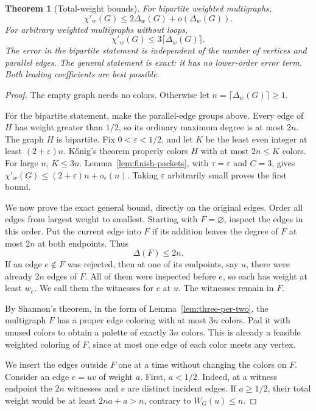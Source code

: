 \documentclass[11pt]{article}
\newtheorem{theorem}{Theorem}[section]
\theoremstyle{definition}\newtheorem{algorithm}{Algorithm}[section]
\numberwithin{equation}{section}
\theoremstyle{remark}\newtheorem*{remark}{Remark}
\begin{document}
\begin{theorem}[Total-weight bounds]\label{thm:total-weight}
For bipartite weighted multigraphs,
\[
 \chi'_w(G)\le2\Delta_w(G)+o(\Delta_w(G)).
\]
For arbitrary weighted multigraphs without loops,
\[
 \chi'_w(G)\le3\lceil\Delta_w(G)\rceil.
\]
The error in the bipartite statement is independent of the number of
vertices and parallel edges.  The general statement is exact: it has no
lower-order error term.  Both leading coefficients are best possible.
\end{theorem}
\begin{proof}
The empty graph needs no colors. Otherwise let
$n=\lceil\Delta_w(G)\rceil\ge1$.

For the bipartite statement, make the parallel-edge groups above.
Every edge of $H$ has weight greater than $1/2$, so its ordinary maximum
degree is at most $2n$.  The graph $H$ is bipartite. Fix
$0<\varepsilon<1/2$, and let $K$
be the least even integer at least $(2+\varepsilon)n$. K\H{o}nig's
theorem properly colors $H$ with at most $2n\le K$ colors.
For large $n$, $K\le3n$. Lemma~\ref{lem:finish-packets}, with
$\tau=\varepsilon$ and $C=3$, gives
$\chi'_w(G)\le(2+\varepsilon)n+o_\varepsilon(n)$. Taking
$\varepsilon$ arbitrarily small proves the first bound.

We now prove the exact general bound, directly on the original edges.
Order all edges from largest weight to smallest.  Starting with
$F=\varnothing$, inspect the edges in this order.  Put the current edge
into $F$ if its addition leaves the degree of $F$ at most $2n$ at both
endpoints.  Thus
\[
 \Delta(F)\le2n.                                      \tag{1}
\]
If an edge $e\notin F$ was rejected, then at one of its endpoints,
say $u$, there were already $2n$ edges of $F$.  All of them were
inspected before $e$, so each has weight at least $w_e$.  We call them
the witnesses for $e$ at $u$.  The witnesses remain in $F$.

By Shannon's theorem, in the form of
Lemma~\ref{lem:three-per-two}, the multigraph $F$ has a proper edge
coloring with at most $3n$ colors.  Pad it with unused colors to obtain
a palette of exactly $3n$ colors.  This is already a feasible weighted
coloring of $F$, since at most one edge of each color meets any vertex.

We insert the edges outside $F$ one at a time without changing the
colors on $F$.  Consider an edge $e=uv$ of weight $a$.  First,
$a<1/2$.  Indeed, at a witness endpoint the $2n$ witnesses and $e$
are distinct incident edges.  If $a\ge1/2$, their total weight would
be at least $2n a+a>n$, contrary to $W_G(u)\le n$.


\end{proof}
\end{document}
